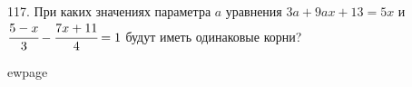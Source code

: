 117. При каких значениях параметра $a$ уравнения $3a + 9ax + 13 = 5x$ и $\cfrac{5-x}{3}-\cfrac{7x+11}{4}=1$ будут иметь одинаковые корни?

ewpage
